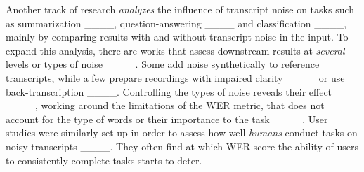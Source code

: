 Another track of research \textit{analyzes} the influence of transcript noise on tasks such as summarization ____, question-answering ____ and classification ____, mainly by comparing results with and without transcript noise in the input.
To expand this analysis, there are works that assess downstream results at \textit{several} levels or types of noise ____. Some add noise synthetically to reference transcripts, while a few prepare recordings with impaired clarity ____ or use back-transcription ____.
Controlling the types of noise reveals their effect ____, working around the limitations of the WER metric, that does not account for the type of words or their importance to the task ____.
User studies were similarly set up in order to assess how well \textit{humans} conduct tasks on noisy transcripts ____.
They often find at which WER score the ability of users to consistently complete tasks starts to deter.


